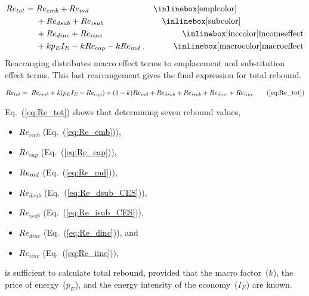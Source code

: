 \begin{align}
  Re_{tot} = \; &Re_{emb} + Re_{\md}      & \mathrm{\empleffect}       \nonumber \\
                &+ Re_{dsub} + Re_{isub}   & \mathrm{\subeffect}        \nonumber \\
                &+ Re_{dinc} + Re_{iinc}   & \mathrm{\inceffect}        \nonumber \\
                &+ k p_E I_E - k Re_{cap} - k Re_{\md} \; .  & \mathrm{\macroeffect}
\end{align}
%
Rearranging distributes macro effect terms 
to emplacement and substitution effect terms.
This last rearrangement gives the final expression for total rebound.

\begin{align}
  Re_{tot} = \; \Retoteqn{} \tag{\ref{eq:Re_tot}}
\end{align}

Eq.~(\ref{eq:Re_tot}) shows that determining seven rebound values,

\begin{itemize}

  \item $Re_{emb}$ (Eq.~(\ref{eq:Re_emb})), 

  \item $Re_{cap}$ (Eq.~(\ref{eq:Re_cap})), 
  
  \item $Re_{md}$ (Eq.~(\ref{eq:Re_md})),
  
  \item $Re_{dsub}$ (Eq.~(\ref{eq:Re_dsub_CES})),
  
  \item $Re_{isub}$ (Eq.~(\ref{eq:Re_isub_CES})), 
  
  \item $Re_{dinc}$ (Eq.~(\ref{eq:Re_dinc})), and
  
  \item $Re_{iinc}$ (Eq.~(\ref{eq:Re_iinc})),

\end{itemize}
%
is sufficient to calculate total rebound, 
provided that 
the macro factor~($k$),
the price of energy~($p_E$), and
the energy intensity of the economy~($I_E$) 
are known.
